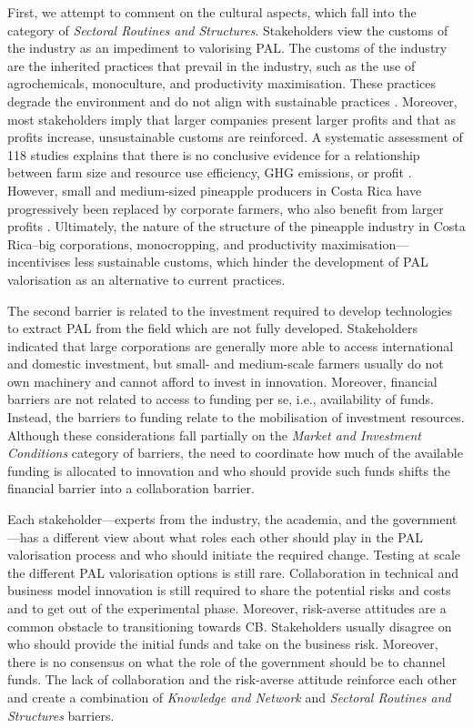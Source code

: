 First, we attempt to comment on the cultural aspects, which fall into the category of \textit{Sectoral Routines and Structures}. Stakeholders view the customs of the industry as an impediment to valorising PAL. The customs of the industry are the inherited practices that prevail in the industry, such as the use of agrochemicals, monoculture, and productivity maximisation. These practices degrade the environment and do not align with sustainable practices \citep{magdoff2000hungry}. Moreover, most stakeholders imply that larger companies present larger profits and that as profits increase, unsustainable customs are reinforced. A systematic assessment of 118 studies explains that there is no conclusive evidence for a relationship between farm size and resource use efficiency, GHG emissions, or profit \citep{ricciardi2021higher}. However, small and medium-sized pineapple producers in Costa Rica have progressively been replaced by corporate farmers, who also benefit from larger profits \citep{rodriguez2020extractivismo}. Ultimately, the nature of the structure of the pineapple industry in Costa Rica--big corporations, monocropping, and productivity maximisation---incentivises less sustainable customs, which hinder the development of PAL valorisation as an alternative to current practices. 

The second barrier is related to the investment required to develop technologies to extract PAL from the field which are not fully developed. Stakeholders indicated that large corporations are generally more able to access international and domestic investment, but small- and medium-scale farmers usually do not own machinery and cannot afford to invest in innovation. Moreover, financial barriers are not related to access to funding per se, i.e., availability of funds. Instead, the barriers to funding relate to the mobilisation of investment resources. Although these considerations fall partially on the \textit{Market and Investment Conditions} category of barriers, the need to coordinate how much of the available funding is allocated to innovation and who should provide such funds shifts the financial barrier into a collaboration barrier. 

Each stakeholder---experts from the industry, the academia, and the government---has a different view about what roles each other should play in the PAL valorisation process and who should initiate the required change. Testing at scale the different PAL valorisation options is still rare. Collaboration in technical and business model innovation is still required to share the potential risks and costs and to get out of the experimental phase. Moreover, risk-averse attitudes are a common obstacle to transitioning towards CB. Stakeholders usually disagree on who should provide the initial funds and take on the business risk. Moreover, there is no consensus on what the role of the government should be to channel funds. The lack of collaboration and the risk-averse attitude reinforce each other and create a combination of \textit{Knowledge and Network} and \textit{Sectoral Routines and Structures} barriers.

